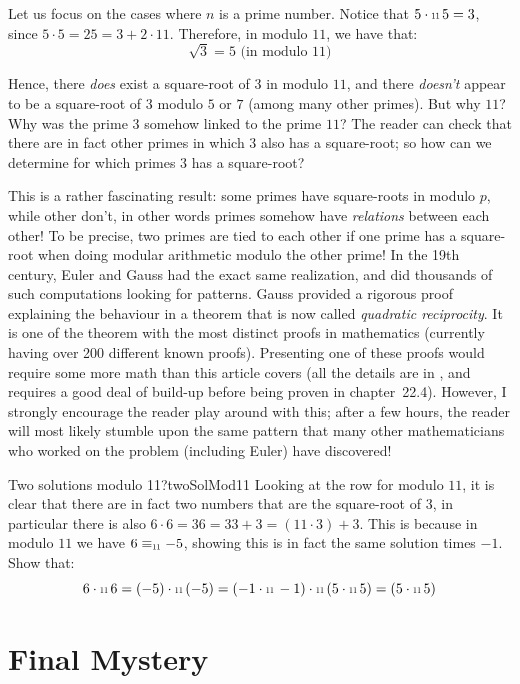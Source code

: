 \documentclass{article}
\newcommand\scalemath[2]{\scalebox{#1}{\mbox{\ensuremath{\displaystyle #2}}}}
\newcommand{\Equiv}[1]{\equiv_{\scalemath{0.6}{#1}}}
\newcommand{\Cdot}[1]{\cdot{\scalemath{0.6}{#1}}\,}
\begin{document}
Let us focus on the cases where $n$ is a prime number. Notice that $5\Cdot{11}5 = 3$, since $5\cdot 5 =25
= 3+2\cdot 11$. Therefore, in modulo $11$, we have that:
\[
  \sqrt{3} =5 \text{ (in modulo $11$)}
\]

Hence, there \emph{does} exist a square-root of $3$ in modulo $11$,
and there \emph{doesn't} appear to be a square-root of $3$ modulo $5$ or $7$ (among many
other primes). But
why $11$? Why was the prime $3$ somehow linked to the prime $11$? The reader can check that
there are in fact other primes in which $3$ also has a square-root; so how can we
determine for which primes $3$ has a square-root?

This is a rather fascinating result: some primes have square-roots in modulo $p$, while other don't, in other
words primes somehow have \emph{relations} between each other! To be precise, two primes are tied to each
other if one prime has a square-root when doing modular arithmetic modulo the other prime! In the 19th
century, Euler and Gauss had the exact same realization, and did thousands of such computations looking for
patterns. Gauss provided a rigorous proof explaining the behaviour in a theorem that is now called
\emph{quadratic reciprocity}. It is one of the theorem with the most distinct proofs in mathematics (currently
having over 200 different known proofs). Presenting one of these proofs would require some more math
than this article covers (all the details are in \cite{NateAlgebra}, and requires a good deal of build-up
before being proven in chapter~22.4). However, I strongly encourage the reader play around with this; after a
few hours, the reader will most likely stumble upon the same pattern that many other mathematicians who worked
on the problem (including Euler) have discovered!

\begin{exercise}{Two solutions modulo 11?}{twoSolMod11}
  Looking at the row for modulo $11$, it is clear that there are in fact two numbers that are the square-root
  of $3$, in particular there is also $6\cdot 6 =36 = 33 + 3 = (11\cdot 3) + 3$. This is because in modulo
  $11$ we have $6 \Equiv{11}-5$, showing this is in fact the same solution times $-1$. Show that:
  \[
    6\Cdot{11}6 = (-5)\Cdot{11}(-5) = ( -1\Cdot{11}-1 )\Cdot{11}( 5\Cdot{11}5 ) = ( 5\Cdot{11}5 )
  \]
\end{exercise}


\section{Final Mystery}
\end{document}
